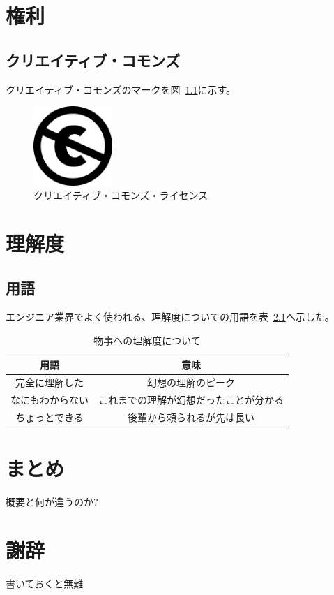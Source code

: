 \documentclass[a4j,openany,12pt]{jsbook}
\begin{document}
\chapter{権利}
\section{クリエイティブ・コモンズ}
クリエイティブ・コモンズのマークを図~\ref{fig:cc}に示す。
\begin{figure}[htbp]
    \centering
    \includegraphics[width=30mm]{./figs/240px-Cc-public_domain_mark_white.png}
    \caption{クリエイティブ・コモンズ・ライセンス\label{fig:cc}}
\end{figure}


\chapter{理解度}
\section{用語}
エンジニア業界でよく使われる、理解度についての用語を表~\ref{tab:understanding}へ示した。
\begin{table}[htbp]
    \centering
    \caption{物事への理解度について\label{tab:understanding}}
    \begin{tabular}{c|c}
        用語             & 意味                                   \\
        \hline
        \hline
        完全に理解した   & 幻想の理解のピーク                     \\
        なにもわからない & これまでの理解が幻想だったことが分かる \\
        ちょっとできる   & 後輩から頼られるが先は長い             \\
        \hline
    \end{tabular}
\end{table}

\chapter{まとめ}
概要と何が違うのか?

\chapter*{謝辞}
書いておくと無難
\end{document}
